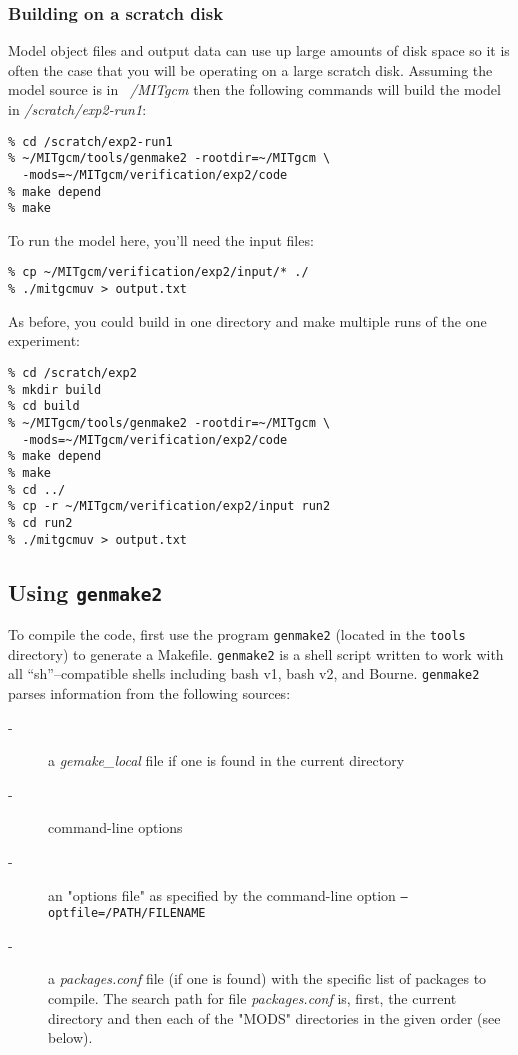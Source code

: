 \subsubsection{Building on a scratch disk}

Model object files and output data can use up large amounts of disk
space so it is often the case that you will be operating on a large
scratch disk. Assuming the model source is in {\em ~/MITgcm} then the
following commands will build the model in {\em /scratch/exp2-run1}:
\begin{verbatim}
% cd /scratch/exp2-run1
% ~/MITgcm/tools/genmake2 -rootdir=~/MITgcm \
  -mods=~/MITgcm/verification/exp2/code
% make depend
% make
\end{verbatim}
To run the model here, you'll need the input files:
\begin{verbatim}
% cp ~/MITgcm/verification/exp2/input/* ./
% ./mitgcmuv > output.txt
\end{verbatim}

As before, you could build in one directory and make multiple runs of
the one experiment:
\begin{verbatim}
% cd /scratch/exp2
% mkdir build
% cd build
% ~/MITgcm/tools/genmake2 -rootdir=~/MITgcm \
  -mods=~/MITgcm/verification/exp2/code
% make depend
% make
% cd ../
% cp -r ~/MITgcm/verification/exp2/input run2
% cd run2
% ./mitgcmuv > output.txt
\end{verbatim}


\subsection{Using \texttt{genmake2}}
\label{sec:genmake}

To compile the code, first use the program \texttt{genmake2} (located
in the \texttt{tools} directory) to generate a Makefile.
\texttt{genmake2} is a shell script written to work with all
``sh''--compatible shells including bash v1, bash v2, and Bourne.
\texttt{genmake2} parses information from the following sources:
\begin{description}
\item[-] a {\em gemake\_local} file if one is found in the current 
  directory
\item[-] command-line options
\item[-] an "options file" as specified by the command-line option
  \texttt{--optfile=/PATH/FILENAME}
\item[-] a {\em packages.conf} file (if one is found) with the 
  specific list of packages to compile. The search path for 
  file {\em packages.conf} is, first, the current directory and
  then each of the "MODS" directories in the given order (see below).
\end{description}

